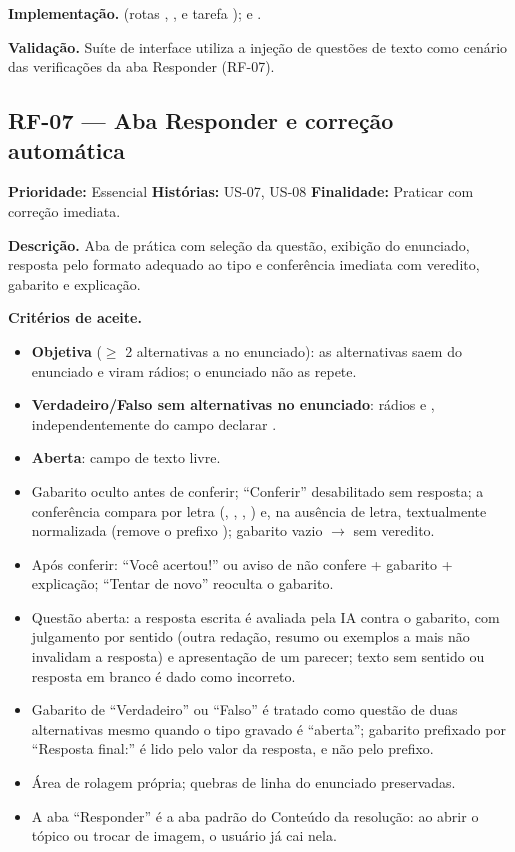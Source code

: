 \textbf{Implementação.}  (rotas \texttt{}, \texttt{}, \texttt{} e tarefa \texttt{});  e .

\textbf{Validação.} Suíte de interface utiliza a injeção de questões de texto como cenário das verificações da aba Responder (RF-07).

\subsection{RF-07 --- Aba Responder e correção automática}

\textbf{Prioridade:} Essencial \quad \textbf{Histórias:} US-07, US-08 \quad \textbf{Finalidade:} Praticar com correção imediata.

\textbf{Descrição.} Aba de prática com seleção da questão, exibição do enunciado, resposta pelo formato adequado ao tipo e conferência imediata com veredito, gabarito e explicação.

\textbf{Critérios de aceite.}
\begin{itemize}
    \item \textbf{Objetiva} ($\geq$ 2 alternativas \texttt{} a \texttt{} no enunciado): as alternativas saem do enunciado e viram rádios; o enunciado não as repete.
    \item \textbf{Verdadeiro/Falso sem alternativas no enunciado}: rádios \texttt{} e \texttt{}, independentemente do campo \texttt{} declarar \texttt{}.
    \item \textbf{Aberta}: campo de texto livre.
    \item Gabarito oculto antes de conferir; ``Conferir'' desabilitado sem resposta; a conferência compara por letra (\texttt{}, \texttt{}, \texttt{}, \texttt{}) e, na ausência de letra, textualmente normalizada (remove o prefixo \texttt{}); gabarito vazio $\rightarrow$ sem veredito.
    \item Após conferir: ``Você acertou!'' ou aviso de não confere + gabarito + explicação; ``Tentar de novo'' reoculta o gabarito.
    \item Questão aberta: a resposta escrita é avaliada pela IA contra o gabarito, com julgamento por sentido (outra redação, resumo ou exemplos a mais não invalidam a resposta) e apresentação de um parecer; texto sem sentido ou resposta em branco é dado como incorreto.
    \item Gabarito de ``Verdadeiro'' ou ``Falso'' é tratado como questão de duas alternativas mesmo quando o tipo gravado é ``aberta''; gabarito prefixado por ``Resposta final:'' é lido pelo valor da resposta, e não pelo prefixo.
    \item Área de rolagem própria; quebras de linha do enunciado preservadas.
    \item A aba ``Responder'' é a aba padrão do Conteúdo da resolução: ao abrir o tópico ou trocar de imagem, o usuário já cai nela.
\end{itemize}

